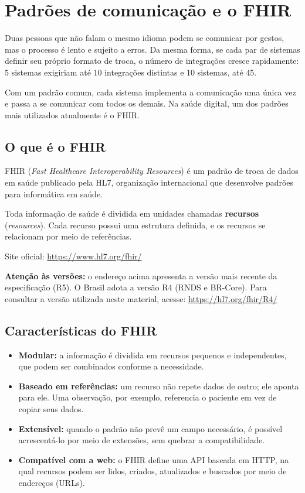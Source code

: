 \documentclass[11pt,a4paper]{article}
\begin{document}
\section{Padrões de comunicação e o FHIR}

Duas pessoas que não falam o mesmo idioma podem se comunicar por gestos,
mas o processo é lento e sujeito a erros. Da mesma forma, se cada par de
sistemas definir seu próprio formato de troca, o número de integrações
cresce rapidamente: 5 sistemas exigiriam até 10 integrações distintas e 10
sistemas, até 45.

Com um padrão comum, cada sistema implementa a comunicação uma única vez e
passa a se comunicar com todos os demais. Na saúde digital, um dos padrões
mais utilizados atualmente é o FHIR.

\subsection{O que é o FHIR}

FHIR (\emph{Fast Healthcare Interoperability Resources}) é um padrão de
troca de dados em saúde publicado pela HL7, organização internacional que
desenvolve padrões para informática em saúde.

Toda informação de saúde é dividida em unidades chamadas
\textbf{recursos} (\emph{resources}). Cada recurso possui uma estrutura
definida, e os recursos se relacionam por meio de referências.

Site oficial: \url{https://www.hl7.org/fhir/}

\textbf{Atenção às versões:} o endereço acima apresenta a versão mais
recente da especificação (R5). O Brasil adota a versão R4 (RNDS e
BR-Core). Para consultar a versão utilizada neste material, acesse:
\url{https://hl7.org/fhir/R4/}

\subsection{Características do FHIR}

\begin{itemize}
  \item \textbf{Modular:} a informação é dividida em recursos pequenos e
    independentes, que podem ser combinados conforme a necessidade.
  \item \textbf{Baseado em referências:} um recurso não repete dados de
    outro; ele aponta para ele. Uma observação, por exemplo, referencia o
    paciente em vez de copiar seus dados.
  \item \textbf{Extensível:} quando o padrão não prevê um campo
    necessário, é possível acrescentá-lo por meio de extensões, sem
    quebrar a compatibilidade.
  \item \textbf{Compatível com a web:} o FHIR define uma API baseada em
    HTTP, na qual recursos podem ser lidos, criados, atualizados e
    buscados por meio de endereços (URLs).
\end{itemize}
\end{document}
